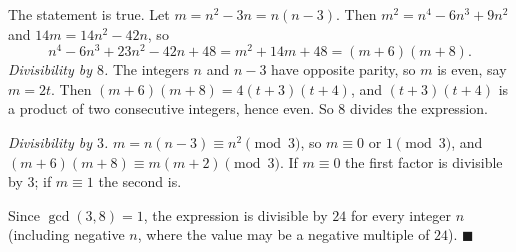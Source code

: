 The statement is true. Let $m=n^2-3n=n(n-3)$. Then $m^2=n^4-6n^3+9n^2$ and $14m=14n^2-42n$, so
\[n^4-6n^3+23n^2-42n+48=m^2+14m+48=(m+6)(m+8).\]
\emph{Divisibility by $8$.} The integers $n$ and $n-3$ have opposite parity, so $m$ is even, say $m=2t$. Then $(m+6)(m+8)=4(t+3)(t+4)$, and $(t+3)(t+4)$ is a product of two consecutive integers, hence even. So $8$ divides the expression.

\emph{Divisibility by $3$.} $m=n(n-3)\equiv n^2\pmod3$, so $m\equiv0$ or $1\pmod3$, and $(m+6)(m+8)\equiv m(m+2)\pmod3$. If $m\equiv0$ the first factor is divisible by $3$; if $m\equiv1$ the second is.

Since $\gcd(3,8)=1$, the expression is divisible by $24$ for every integer $n$ (including negative $n$, where the value may be a negative multiple of $24$). $\blacksquare$
